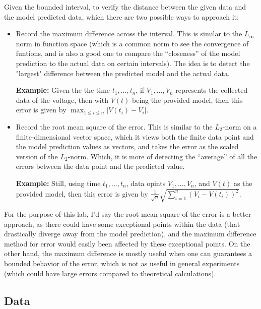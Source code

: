 \documentclass{article}
\begin{document}
Given the bounded interval, to verify the distance between the given data and the model predicted data, which there are two possible ways to approach it:
\begin{itemize}
    \item Record the maximum difference across the interval. This is similar to the $L_\infty$ norm in function space (which is a common norm to see the convergence of funtions, and is also a good one to compare the ``closeness'' of the model prediction to the actual data on certain intervals). The idea is to detect the "largest" difference between the predicted model and the actual data.
    
    \textbf{Example:} Given the the time $t_1,...,t_n$, if $V_1,...,V_n$ represents the collected data of the voltage, then with $V(t)$ being the provided model, then this error is given by $\max_{1\leq i\leq n}|V(t_i)-V_i|$.

    \hfil

    \item Record the root mean square of the error. This is similar to the $L_2$-norm on a finite-dimensional vector space, which it views both the finite data point and the model prediction values as vectors, and takes the error as the scaled version of the $L_2$-norm. Which, it is more of detecting the ``average'' of all the errors between the data point and the predicted value. 
    
    \textbf{Example:} Still, using time $t_1,...,t_n$, data opints $V_1,...,V_n$, and $V(t)$ as the provided model, then this error is given by $\frac{1}{\sqrt{n}}\sqrt{\sum_{i=1}^n(V_i-V(t_i))^2}$.
\end{itemize}

\hfil

For the purpose of this lab, I'd say the root mean square of the error is a better approach, as there could have some exceptional points within the data (that drastically diverge away from the model prediction), and the maximum difference method for error would easily been affected by these exceptional points. On the other hand, the maximum difference is mostly useful when one can guarantees a bounded behavior of the error, which is not as useful in general experiments (which could have large errors compared to theoretical calculations).

\hfil

\subsection{Data}
\end{document}
